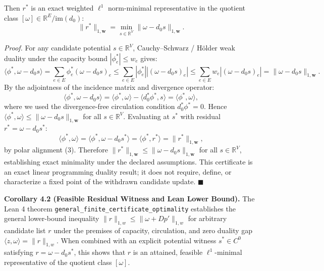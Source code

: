 \documentclass[
]{article}
\begin{document}
Then \(r^*\) is an exact weighted \(\ell^1\) norm-minimal representative in the quotient class \([\omega] \in \mathbb{R}^E / \mathrm{im}(d_0)\):
\[\|r^*\|_{1,\mathbf{w}} = \min_{s \in \mathbb{R}^V} \|\omega - d_0 s\|_{1,\mathbf{w}}.\]

\emph{Proof.} For any candidate potential \(s \in \mathbb{R}^V\), Cauchy--Schwarz / Hölder weak duality under the capacity bound \(|\phi_e^*| \le w_e\) gives:
\[\langle \phi^*, \omega - d_0 s \rangle = \sum_{e \in E} \phi_e^* (\omega - d_0 s)_e \le \sum_{e \in E} |\phi_e^*| |(\omega - d_0 s)_e| \le \sum_{e \in E} w_e |(\omega - d_0 s)_e| = \|\omega - d_0 s\|_{1,\mathbf{w}}.\]
By the adjointness of the incidence matrix and divergence operator:
\[\langle \phi^*, \omega - d_0 s \rangle = \langle \phi^*, \omega \rangle - \langle d_0^* \phi^*, s \rangle = \langle \phi^*, \omega \rangle,\]
where we used the divergence-free circulation condition \(d_0^* \phi^* = 0\). Hence \(\langle \phi^*, \omega \rangle \le \|\omega - d_0 s\|_{1,\mathbf{w}}\) for all \(s \in \mathbb{R}^V\). Evaluating at \(s^*\) with residual \(r^* = \omega - d_0 s^*\):
\[\langle \phi^*, \omega \rangle = \langle \phi^*, \omega - d_0 s^* \rangle = \langle \phi^*, r^* \rangle = \|r^*\|_{1,\mathbf{w}},\]
by polar alignment (3). Therefore \(\|r^*\|_{1,\mathbf{w}} \le \|\omega - d_0 s\|_{1,\mathbf{w}}\) for all \(s \in \mathbb{R}^V\), establishing exact minimality under the declared assumptions. This certificate is an exact linear programming duality result; it does not require, define, or characterize a fixed point of the withdrawn candidate update. \(\blacksquare\)

\textbf{Corollary 4.2 (Feasible Residual Witness and Lean Lower Bound).} The Lean 4 theorem \texttt{general\_finite\_certificate\_optimality} establishes the general lower-bound inequality \(\|r\|_{1,w} \le \|\omega + Dp'\|_{1,w}\) for arbitrary candidate list \(r\) under the premises of capacity, circulation, and zero duality gap \(\langle z, \omega \rangle = \|r\|_{1,w}\). When combined with an explicit potential witness \(s^* \in C^0\) satisfying \(r = \omega - d_0 s^*\), this shows that \(r\) is an attained, feasible \(\ell^1\)-minimal representative of the quotient class \([\omega]\).
\end{document}
